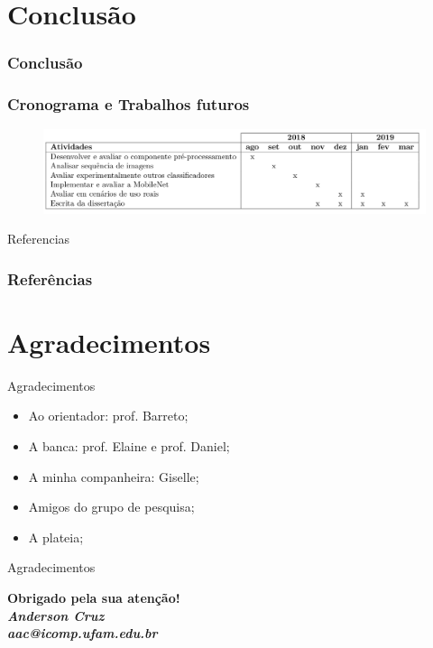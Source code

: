 \documentclass{beamer}
\begin{document}


\section{Conclusão}

\begin{frame}
\frametitle{Conclusão}

\end{frame}


\begin{frame}
 \frametitle{Cronograma e Trabalhos futuros}
\begin{figure}
\centering
\includegraphics[scale=0.22]{figuras/cronograma.png}
\label{fig:arquitetura}
\end{figure}
\end{frame}



\begin{frame}{Referencias}
\frametitle{Referências}
    \tiny{ }
    
\end{frame}


\section{Agradecimentos}
\begin{frame}{Agradecimentos}
\begin{itemize}
 \item Ao orientador: prof. Barreto; 
\item A banca: prof. Elaine e prof. Daniel;
\item A minha companheira: Giselle;
\item Amigos do grupo de pesquisa;
\item A plateia;
\end{itemize}

\end{frame}

  \begin{frame}{Agradecimentos}
  \begin{center}
 
  \textcolor{VerdeUFAM}{\Large \textbf{Obrigado pela sua atenção!}} \\
  \vspace*{20px}
  \textit{\textbf{Anderson Cruz}} \\
  \textit{\textbf{aac@icomp.ufam.edu.br}}
 
  \end{center}
  \end{frame}

 
 
\end{document}
